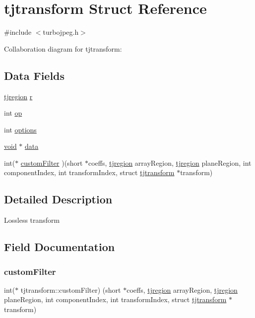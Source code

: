 \hypertarget{structtjtransform}{}\section{tjtransform Struct Reference}
\label{structtjtransform}


{\ttfamily \#include $<$turbojpeg.\+h$>$}



Collaboration diagram for tjtransform\+:
\subsection*{Data Fields}
\begin{DoxyCompactItemize}
\item 
\hyperlink{structtjregion}{tjregion} \hyperlink{structtjtransform_ac324e5e442abec8a961e5bf219db12cf}{r}
\item 
int \hyperlink{structtjtransform_a2525aab4ba6978a1c273f74fef50e498}{op}
\item 
int \hyperlink{structtjtransform_ac0e74655baa4402209a21e1ae481c8f6}{options}
\item 
\hyperlink{png_8h_ac9c84fa68bbad002983e35ce3663c686}{void} $\ast$ \hyperlink{structtjtransform_a688fe8f1a8ecc12a538d9e561cf338e3}{data}
\item 
int($\ast$ \hyperlink{structtjtransform_afd7fc262df33f741e120ef4183202ef5}{custom\+Filter} )(short $\ast$coeffs, \hyperlink{structtjregion}{tjregion} array\+Region, \hyperlink{structtjregion}{tjregion} plane\+Region, int component\+Index, int transform\+Index, struct \hyperlink{structtjtransform}{tjtransform} $\ast$transform)
\end{DoxyCompactItemize}


\subsection{Detailed Description}
Lossless transform 

\subsection{Field Documentation}
\mbox{\label{structtjtransform_afd7fc262df33f741e120ef4183202ef5}} 
\subsubsection{\texorpdfstring{custom\+Filter}{customFilter}}
{\footnotesize\ttfamily int($\ast$ tjtransform\+::custom\+Filter) (short $\ast$coeffs, \hyperlink{structtjregion}{tjregion} array\+Region, \hyperlink{structtjregion}{tjregion} plane\+Region, int component\+Index, int transform\+Index, struct \hyperlink{structtjtransform}{tjtransform} $\ast$transform)}

